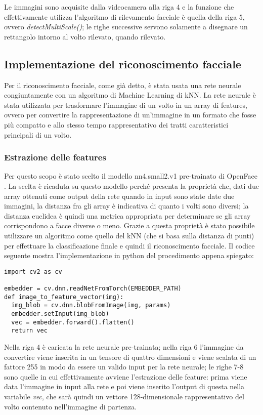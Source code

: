 Le immagini sono acquisite dalla videocamera alla riga 4 e la funzione che effettivamente utilizza l'algoritmo di rilevamento facciale è quella della riga 5, ovvero \textit{detectMultiScale()}; le righe successive servono solamente a disegnare un rettangolo intorno al volto rilevato, quando rilevato. 

\subsection{Implementazione del riconoscimento facciale}
Per il riconoscimento facciale, come già detto, è stata usata una rete neurale congiuntamente con un algoritmo di Machine Learning di kNN. La rete neurale è stata utilizzata per trasformare l'immagine di un volto in un array di features, ovvero per convertire la rappresentazione di un'immagine in un formato che fosse più compatto e allo stesso tempo rappresentativo dei tratti caratteristici principali di un volto. 

\subsubsection{Estrazione delle features}
Per questo scopo è stato scelto il modello nn4.small2.v1 pre-trainato di OpenFace \cite{amos2016openface}. La scelta è ricaduta su questo modello perché presenta la proprietà che, dati due array ottenuti come output della rete quando in input sono state date due immagini, la distanza fra gli array è indicativa di quanto i volti sono diversi; la distanza euclidea è quindi una metrica appropriata per determinare se gli array corrispondono a facce diverse o meno. Grazie a questa proprietà è stato possibile utilizzare un algoritmo come quello del kNN (che si basa sulla distanza di punti) per effettuare la classificazione finale e quindi il riconoscimento facciale. Il codice seguente mostra l'implementazione in python del procedimento appena spiegato:

\begin{lstlisting}
import cv2 as cv 

embedder = cv.dnn.readNetFromTorch(EMBEDDER_PATH)
def image_to_feature_vector(img):
  img_blob = cv.dnn.blobFromImage(img, params)
  embedder.setInput(img_blob)
  vec = embedder.forward().flatten()
  return vec
\end{lstlisting}


Nella riga 4 è caricata la rete neurale pre-trainata; nella riga 6 l'immagine da convertire viene inserita in un tensore di quattro dimensioni e viene scalata di un fattore 255 in modo da essere un valido input per la rete neurale; le righe 7-8 sono quelle in cui effettivamente avviene l'estrazione delle feature: prima viene data l'immagine in input alla rete e poi viene inserito l'output di questa nella variabile \textit{vec}, che sarà quindi un vettore 128-dimensionale rappresentativo del volto contenuto nell'immagine di partenza.

